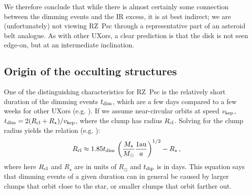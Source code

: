 \documentclass[]{rsos}
\begin{document}
We therefore conclude that while there is almost certainly some connection between the
dimming events and the IR excess, it is at best indirect; we are (unfortunately) not
viewing RZ~Psc through a representative part of an asteroid belt analogue. As with other
UXors, a clear prediction is that the disk is not seen edge-on, but at an intermediate
inclination.

\subsection{Origin of the occulting structures}\label{ss:orig}

One of the distinguishing characteristics for RZ~Psc is the relatively short duration of
the dimming events $t_{\rm dim}$, which are a few days compared to a few weeks for other
UXors (e.g. \cite{1999AJ....118.1043H,2010A&A...511L...9C}). If we assume near-circular
orbits at speed $v_{\rm kep}$, $t_{\rm dim}=2(R_{\rm cl}+R_\star)/v_{\rm kep}$, where the
clump has radius $R_{\rm cl}$. Solving for the clump radius yields the relation
(e.g. \cite{2016ApJ...816...69A,2016MNRAS.457.3988B}):
\begin{equation}
  R_{\rm cl} \approx 1.85 t_{\rm dim} \, \left( \frac{M_\star}{M_\odot} \frac{1 {\rm au}}{a} \right)^{1/2} - R_\star \, ,
\end{equation}
where here $R_{\rm cl}$ and $R_\star$ are in units of $R_\odot$ and $t_{\rm dip}$ is in
days. This equation says that dimming events of a given duration can in general be caused
by larger clumps that orbit close to the star, or smaller clumps that orbit farther out.

\end{document}
